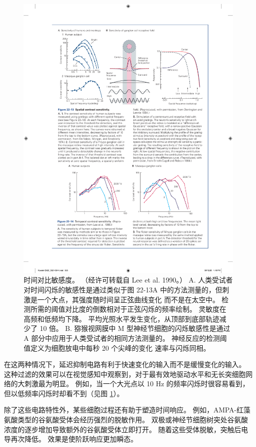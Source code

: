 \begin{figure}[htbp]
	\centering
	\includegraphics[width=1.0\linewidth]{chap22/fig_22_14}
	\caption{时间对比敏感度。 （经许可转载自 Lee et al. 1990。）
		A. 人类受试者对时间闪烁的敏感性是通过类似于图 22-13A 中的方法测量的，但刺激是一个大点，其强度随时间呈正弦曲线变化 而不是在太空中。 
		检测所需的阈值对比度的倒数相对于正弦闪烁的频率绘制。 
		灵敏度在高频和低频均下降。 
		平均光照水平发生变化，从顶部到底部轨迹减少了 10 倍。 
		B. 猕猴视网膜中 M 型神经节细胞的闪烁敏感性是通过 A 部分中应用于人类受试者的相同方法测量的。
		神经反应的检测阈值定义为细胞放电中每秒 20 个尖峰的变化 速率与闪烁同相。}
	\label{fig:22_14}
\end{figure}

在这两种情况下，延迟抑制电路有利于快速变化的输入而不是缓慢变化的输入。 
这种过滤的效果可以在视觉感知中观察到，对于最有效地驱动水平和无长突细胞网络的大刺激最为明显。 
例如，当一个大光点以 10 Hz 的频率闪烁时很容易看到，但以低频率闪烁时却看不到（见图 \ref{fig:22_14}）。


除了这些电路特性外，某些细胞过程还有助于塑造时间响应。 
例如，AMPA-红藻氨酸类型的谷氨酸受体会经历强烈的脱敏作用。 
双极或神经节细胞树突处谷氨酸浓度的逐步增加导致额外的谷氨酸受体立即打开。 
随着这些受体脱敏，突触后电导再次降低。 
效果是使阶跃响应更加瞬态。


